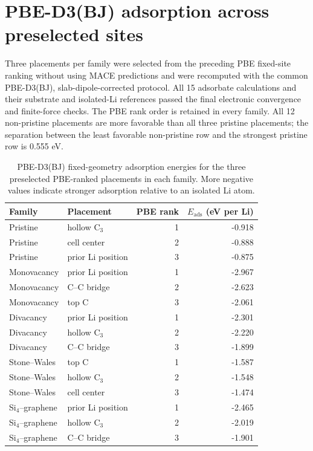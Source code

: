 \documentclass[11pt]{article}
\begin{document}
\section{PBE-D3(BJ) adsorption across preselected sites}

Three placements per family were selected from the preceding PBE fixed-site
ranking without using MACE predictions and were recomputed with the common
PBE-D3(BJ), slab-dipole-corrected protocol. All 15 adsorbate calculations and
their substrate and isolated-Li references passed the final electronic
convergence and finite-force checks. The PBE rank order is retained in every
family. All 12 non-pristine placements are more favorable than all three
pristine placements; the separation between the least favorable
non-pristine row and the strongest pristine row is 0.555 eV.

\begin{table}[H]
  \centering
  \small
  \caption{PBE-D3(BJ) fixed-geometry adsorption energies for the three
  preselected PBE-ranked placements in each family. More negative values
  indicate stronger adsorption relative to an isolated Li atom.}
  \label{tab:si_d3_sites}
  \begin{tabular}{llrr}
    \toprule
    Family & Placement & PBE rank & $E_{\mathrm{ads}}$ (eV per Li) \\
    \midrule
    Pristine & hollow C$_3$ & 1 & -0.918 \\
    Pristine & cell center & 2 & -0.888 \\
    Pristine & prior Li position & 3 & -0.875 \\
    Monovacancy & prior Li position & 1 & -2.967 \\
    Monovacancy & C--C bridge & 2 & -2.623 \\
    Monovacancy & top C & 3 & -2.061 \\
    Divacancy & prior Li position & 1 & -2.301 \\
    Divacancy & hollow C$_3$ & 2 & -2.220 \\
    Divacancy & C--C bridge & 3 & -1.899 \\
    Stone--Wales & top C & 1 & -1.587 \\
    Stone--Wales & hollow C$_3$ & 2 & -1.548 \\
    Stone--Wales & cell center & 3 & -1.474 \\
    Si$_4$--graphene & prior Li position & 1 & -2.465 \\
    Si$_4$--graphene & hollow C$_3$ & 2 & -2.019 \\
    Si$_4$--graphene & C--C bridge & 3 & -1.901 \\
    \bottomrule
  \end{tabular}
\end{table}
\end{document}
